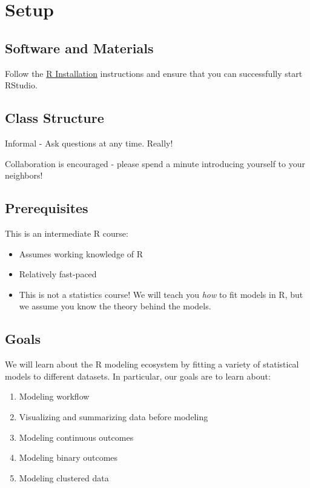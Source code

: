 \documentclass[
]{book}
\providecommand{\tightlist}{%
  \setlength{\itemsep}{0pt}\setlength{\parskip}{0pt}}
\begin{document}
\hypertarget{setup-1}{%
\section{Setup}\label{setup-1}}

\hypertarget{software-and-materials-1}{%
\subsection{Software and Materials}\label{software-and-materials-1}}

Follow the \href{./Rinstall.html}{R Installation} instructions and ensure that you can successfully start RStudio.

\hypertarget{class-structure-1}{%
\subsection{Class Structure}\label{class-structure-1}}

Informal - Ask questions at any time. Really!

Collaboration is encouraged - please spend a minute introducing yourself to your neighbors!

\hypertarget{prerequisites-1}{%
\subsection{Prerequisites}\label{prerequisites-1}}

This is an intermediate R course:

\begin{itemize}
\tightlist
\item
  Assumes working knowledge of R
\item
  Relatively fast-paced
\item
  This is not a statistics course! We will teach you \emph{how} to fit models in R, but we assume you know the theory behind the models.
\end{itemize}

\hypertarget{goals-1}{%
\subsection{Goals}\label{goals-1}}

We will learn about the R modeling ecosystem by fitting a variety of statistical models to different datasets. In particular, our goals are to learn about:

\begin{enumerate}
\def\labelenumi{\arabic{enumi}.}
\tightlist
\item
  Modeling workflow
\item
  Visualizing and summarizing data before modeling
\item
  Modeling continuous outcomes
\item
  Modeling binary outcomes
\item
  Modeling clustered data
\end{enumerate}
\end{document}
